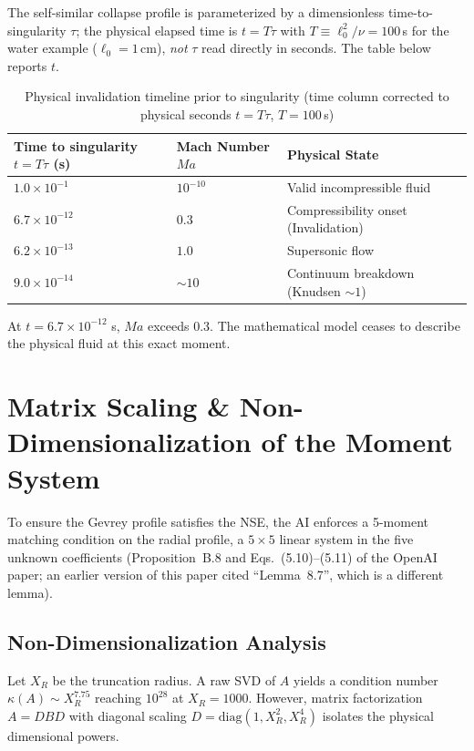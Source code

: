 \documentclass[11pt,a4paper]{article}
\theoremstyle{definition}
\begin{document}
The self-similar collapse profile is parameterized by a dimensionless time-to-singularity $\tau$; the physical elapsed time is $t = T\tau$ with $T \equiv \ell_0^2/\nu = 100$\,s for the water example ($\ell_0 = 1$\,cm), \emph{not} $\tau$ read directly in seconds. The table below reports $t$.

\begin{table}[h]
\centering
\caption{Physical invalidation timeline prior to singularity (time column corrected to physical seconds $t=T\tau$, $T=100$\,s)}
\begin{tabular}{@{}lll@{}}
\toprule
Time to singularity $t=T\tau$ (s) & Mach Number $Ma$ & Physical State \\
\midrule
$1.0 \times 10^{-1}$ & $10^{-10}$ & Valid incompressible fluid \\
$6.7 \times 10^{-12}$ & $0.3$ & Compressibility onset (Invalidation) \\
$6.2 \times 10^{-13}$ & $1.0$ & Supersonic flow \\
$9.0 \times 10^{-14}$ & $\sim 10$ & Continuum breakdown (Knudsen $\sim 1$) \\
\bottomrule
\end{tabular}
\end{table}

At $t = 6.7 \times 10^{-12}$ s, $Ma$ exceeds 0.3. The mathematical model ceases to describe the physical fluid at this exact moment.

\section{Matrix Scaling \& Non-Dimensionalization of the Moment System}

To ensure the Gevrey profile satisfies the NSE, the AI enforces a 5-moment matching condition on the radial profile, a $5\times5$ linear system in the five unknown coefficients (Proposition~B.8 and Eqs.~(5.10)--(5.11) of the OpenAI paper; an earlier version of this paper cited ``Lemma~8.7'', which is a different lemma).

\subsection{Non-Dimensionalization Analysis}
Let $X_R$ be the truncation radius. A raw SVD of $A$ yields a condition number $\kappa(A) \sim X_R^{7.75}$ reaching $10^{28}$ at $X_R = 1000$. However, matrix factorization $A = D B D$ with diagonal scaling $D = \text{diag}(1, X_R^2, X_R^4)$ isolates the physical dimensional powers.
\end{document}
